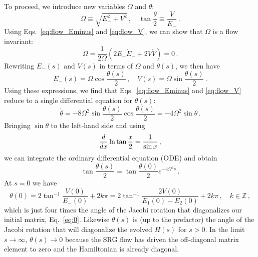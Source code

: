 {To proceed, we introduce new variables $\Omega$ and $\theta$:
\begin{equation}
  \Omega \equiv \sqrt{E_{-}^2 + V^2}\,,\quad \tan\frac{\theta}{2} \equiv \frac{V}{E_{-}}\,.
\end{equation}
Using Eqs.~\eqref{eq:flow_Eminus} and \eqref{eq:flow_V}, we can show 
that $\Omega$ is a flow invariant:
\begin{equation}
  \dot\Omega = \frac{1}{2\Omega}(2 E_{-}\dot{E}_{-} + 2 V \dot{V}) = 0\,.
\end{equation}
Rewriting $E_{-}(s)$ and $V(s)$ in terms of $\Omega$ and $\theta(s)$,
we then have
\begin{equation}\label{eq:srg_toy_parameters}
  E_{-}(s) = \Omega \cos\frac{\theta(s)}{2}\,,\quad V(s) = \Omega \sin\frac{\theta(s)}{2}\,.
\end{equation}
Using these expressions, we find that Eqs.~\eqref{eq:flow_Eminus} and \eqref{eq:flow_V}
reduce to a single differential equation for $\theta(s)$:
\begin{equation}
  \dot\theta = - 8\Omega^2\sin\frac{\theta(s)}{2}\cos\frac{\theta(s)}{2} = -4\Omega^2\sin\theta\,.
\end{equation}
Bringing $\sin\theta$ to the left-hand side and using
\begin{equation}
   \frac{d {}} {d {x}} \ln\tan\frac{x}{2}=\frac{1}{\sin x}\,,
\end{equation}
we can integrate the ordinary differential equation (ODE) and obtain
\begin{equation}\label{eq:srg_toy_theta}
  \tan\frac{\theta(s)}{2} = \tan\frac{\theta(0)}{2} e^{-4\Omega^2 s}\,.
\end{equation}
At $s=0$ we have
\begin{equation}
  \theta(0) = 2 \tan^{-1} \frac{V(0)}{E_{-}(0)} + 2k\pi= 2 \tan^{-1}\frac{2 V(0)}{E_{1}(0) - E_{2}(0)}+2k\pi\,,
  \quad k \in \mathbb{Z}\,,
\end{equation}
which is just four times the angle of the Jacobi rotation that diagonalizes our initial
matrix, Eq.~\eqref{eq:0}. Likewise $\theta(s)$ is (up to the prefactor) the 
angle of the Jacobi rotation that will diagonalize the evolved $H(s)$ for $s>0$. In 
the limit $s\to\infty$,
$\theta(s)\to 0$ because the SRG flow has driven the off-diagonal matrix element to 
zero and the Hamiltonian is already diagonal.

}
